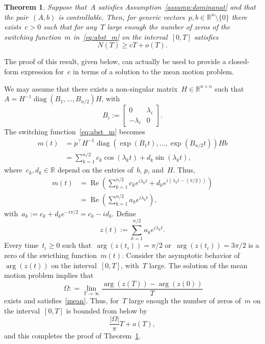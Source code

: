 \documentclass[final ]{IEEEtran}
\newcommand{\real}{\operatorname{Re}}
\newcommand{\diag}{\operatorname{diag}}
\newtheorem{theorem}{Theorem}
\newcommand {\R}{\mathbb R}
\begin{document}
\begin{theorem}\label{thm:main}
Suppose that~$A$ satisfies Assumption~\ref{assump:dominanat} and that the pair~$(A,b) $ is controllable. 
%
 Then, for   generic vectors~$p,b\in\R^{n}\setminus\{0\}$
 there exists~$c>0$ such that 
   for any~$T$ large enough  the number of zeros of the switching function~$m$ in~\eqref{eq:abst_m} on the interval~$[0,T]$ satisfies
   \[
   N(T)\geq c T+o(T).
   \]
\end{theorem}

The proof of this result, given below, can actually be used to
provide a closed-form
expression for~$c$ in terms of a  solution to 
the mean motion problem. 

\begin{IEEEproof}
We may assume that there exists a non-singular matrix~$H\in\R^{n\times n}$ such that~$A=H^{-1}\diag(B_1,\dots,B_{n/2})H$, with
\[
B_i:=\begin{bmatrix} 0& \lambda_i\\-\lambda_i &0 \end{bmatrix}.
\]
The switching function~\eqref{eq:abst_m}  
becomes 
\begin{align*} 
m(t) &= p^\top  H^{-1} \diag(\exp(B_1 t),\dots,\exp(B_{n/2}t)) H b\\
&=  \sum_{k=1}^{n/2}  c_k \cos(\lambda_k t)+d_k \sin(\lambda_k t),
\end{align*}
where~$c_k,d_k\in\R$   depend on  the 
entries     of~$b$, $p$, and~$H$. Thus, 
\begin{align*} 
m(t) &= \real( \sum_{k=1}^{n/2}  c_k e^{i \lambda_k t}+
d_k e^{i(    \lambda_k t -(\pi/2) )}  )
\\
&=  \real(  \sum_{k=1}^{n/2}   a_k  e^{i \lambda_k t}   ) ,
\end{align*}
with~$a_k:=c_k+d_ke^{-i\pi/2}=c_k-id_k$. 
Define 
\[
z(t):= \sum_{k=1}^{n/2}   a_k  e^{i \lambda_k t} .
\]
 Every time~$t_i\geq 0 $ such that~$ \arg(z(t_i)) = \pi/2$ or~$\arg(z(t_i)) =3  \pi/2  $
is a zero of the swicthing function~$m(t)$. Consider the asymptotic
behavior of~$\arg(z(t))$ on the interval~$ [0,T]$, with~$T$  large.  
The solution of the mean motion problem implies that
\[\
\Omega : = \lim_{T\to\infty}  \frac{ \arg(z(T))-\arg(z(0))} {T} 
\]
exists and satisfies~\eqref{mean}. Thus, for~$T$ large enough  the number of zeros of~$m$ on the interval~$[0,T]$
is bounded from below by
\[
\frac{|\Omega|}{\pi}T+o(T) , 
\]
and this completes the proof of Theorem~\ref{thm:main}. 
\end{IEEEproof}
\end{document}
